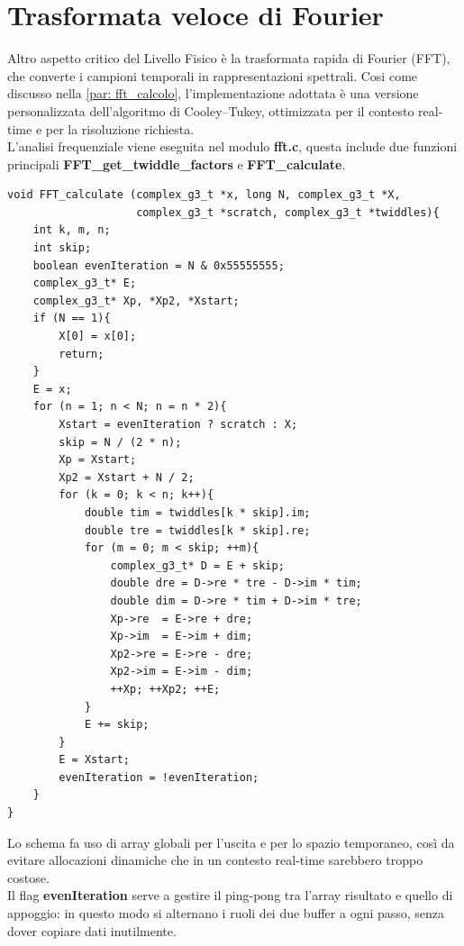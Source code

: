 \section{Trasformata veloce di Fourier}
Altro aspetto critico del Livello Fisico è la trasformata rapida di Fourier (FFT), che converte i campioni temporali in rappresentazioni spettrali. 
Cosi come discusso nella \autoref{par: fft_calcolo}, l’implementazione adottata è una versione personalizzata dell’algoritmo di Cooley–Tukey, ottimizzata per
 il contesto real-time e per la risoluzione richiesta. \\
 L'analisi frequenziale viene eseguita nel modulo \textbf{fft.c}, questa include due funzioni principali \textbf{FFT\_get\_twiddle\_factors} e \textbf{FFT\_calculate}. \\

\begin{verbatim}
void FFT_calculate (complex_g3_t *x, long N, complex_g3_t *X,
                    complex_g3_t *scratch, complex_g3_t *twiddles){
    int k, m, n;
    int skip;
    boolean evenIteration = N & 0x55555555;
    complex_g3_t* E;
    complex_g3_t* Xp, *Xp2, *Xstart;
    if (N == 1){
        X[0] = x[0];
        return;
    }
    E = x;
    for (n = 1; n < N; n = n * 2){
        Xstart = evenIteration ? scratch : X;
        skip = N / (2 * n);
        Xp = Xstart;
        Xp2 = Xstart + N / 2;
        for (k = 0; k < n; k++){
            double tim = twiddles[k * skip].im;
            double tre = twiddles[k * skip].re;
            for (m = 0; m < skip; ++m){
                complex_g3_t* D = E + skip;
                double dre = D->re * tre - D->im * tim;
                double dim = D->re * tim + D->im * tre;
                Xp->re  = E->re + dre;
                Xp->im  = E->im + dim;
                Xp2->re = E->re - dre;
                Xp2->im = E->im - dim;
                ++Xp; ++Xp2; ++E;
            }
            E += skip;
        }
        E = Xstart;
        evenIteration = !evenIteration;
    }
}
\end{verbatim}

Lo schema fa uso di array globali per l’uscita e per lo spazio temporaneo, così da evitare allocazioni
 dinamiche che in un contesto real-time sarebbero troppo costose.\\
  Il flag \textbf{evenIteration} serve 
 a gestire il ping-pong tra l’array risultato e quello di appoggio:
 in questo modo si alternano i ruoli dei due buffer a ogni passo, senza dover copiare dati inutilmente.


